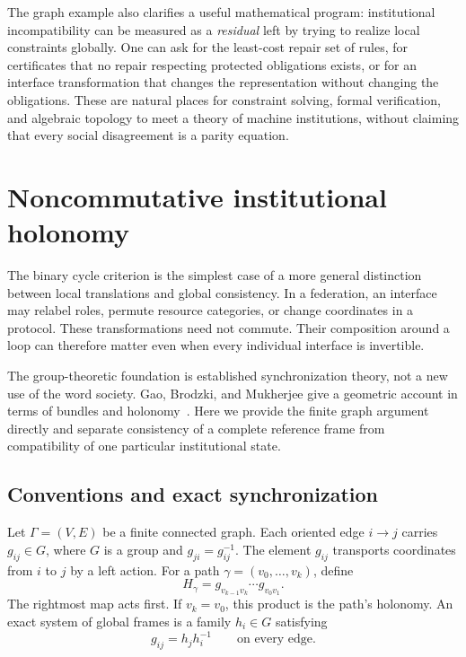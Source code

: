 \documentclass[11pt,letterpaper]{article}
\theoremstyle{plain}
\theoremstyle{definition}
\theoremstyle{remark}
\begin{document}
The graph example also clarifies a useful mathematical program: institutional incompatibility can be measured as a \emph{residual} left by trying to realize local constraints globally. One can ask for the least-cost repair set of rules, for certificates that no repair respecting protected obligations exists, or for an interface transformation that changes the representation without changing the obligations. These are natural places for constraint solving, formal verification, and algebraic topology to meet a theory of machine institutions, without claiming that every social disagreement is a parity equation.


\section{Noncommutative institutional holonomy}\label{sec:holonomy}
The binary cycle criterion is the simplest case of a more general distinction between local translations and global consistency. In a federation, an interface may relabel roles, permute resource categories, or change coordinates in a protocol. These transformations need not commute. Their composition around a loop can therefore matter even when every individual interface is invertible.

The group-theoretic foundation is established synchronization theory, not a new use of the word society. Gao, Brodzki, and Mukherjee give a geometric account in terms of bundles and holonomy~\cite{gaosync}. Here we provide the finite graph argument directly and separate consistency of a complete reference frame from compatibility of one particular institutional state.

\subsection{Conventions and exact synchronization}
Let $\Gamma=(V,E)$ be a finite connected graph. Each oriented edge $i\to j$ carries $g_{ij}\in G$, where $G$ is a group and $g_{ji}=g_{ij}^{-1}$. The element $g_{ij}$ transports coordinates from $i$ to $j$ by a left action. For a path $\gamma=(v_0,\ldots,v_k)$, define
\[
H_\gamma=g_{v_{k-1}v_k}\cdots g_{v_0v_1}.
\]
The rightmost map acts first. If $v_k=v_0$, this product is the path's holonomy. An exact system of global frames is a family $h_i\in G$ satisfying
\[
g_{ij}=h_jh_i^{-1}\qquad\text{on every edge}.
\]
\end{document}
